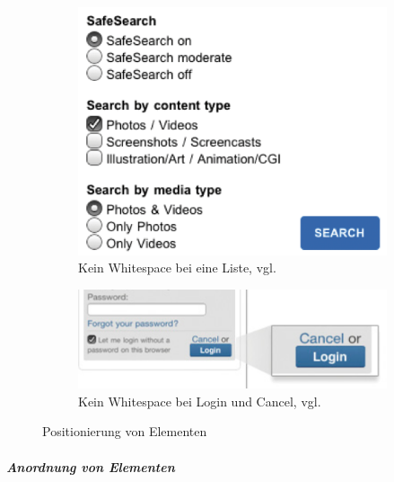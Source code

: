 \begin{figure}
	\centering
	\begin{subfigure}[b]{0.3\textwidth}
		\centering
		\includegraphics[width=1\textwidth]{img/login.png}
		\caption{Kein Whitespace bei eine Liste, vgl. \cite{mobileFirst}}
		\label{fig:login}
	\end{subfigure}
	\begin{subfigure}[b]{0.6\textwidth}
		\centering
			\includegraphics[width=1\textwidth]{img/cancel.png}
	\caption{Kein Whitespace bei Login und Cancel, vgl. \cite{mobileFirst}}\label{fig:cancel}
	\end{subfigure}
	\caption{Positionierung von Elementen}\label{fig:elementPos}
\end{figure}
\subparagraph{Anordnung von Elementen} 
\label{subp:anordnung_von_elementen}

